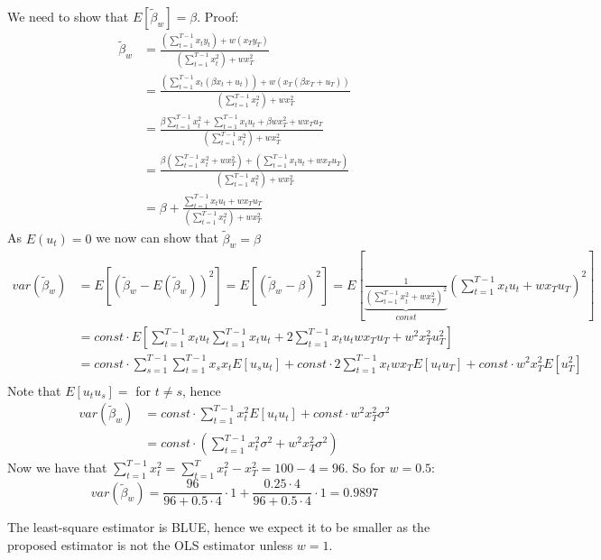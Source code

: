 \documentclass{article}
\begin{document}
\begin{Answer}
\Question
We need to show that $E[\tilde{\beta}_w] = \beta$. Proof:
\begin{align*}
\tilde{\beta}_w &= \frac{(\sum_{t=1}^{T-1}x_ty_t) + w (x_T y_T)}{(\sum_{t=1}^{T-1}x_t^2)+w x_T^2}\\
&= \frac{(\sum_{t=1}^{T-1}x_t(\beta x_t + u_t)) + w (x_T (\beta x_T + u_T))}{(\sum_{t=1}^{T-1}x_t^2)+w x_T^2}\\
&= \frac{\beta\sum_{t=1}^{T-1}x_t^2 + \sum_{t=1}^{T-1} x_t u_t + \beta w x_T^2 + w x_T u_T}{(\sum_{t=1}^{T-1}x_t^2)+w x_T^2}\\
&= \frac{\beta(\sum_{t=1}^{T-1}x_t^2 + w x_T^2) + (\sum_{t=1}^{T-1} x_t u_t  + w x_T u_T)}{(\sum_{t=1}^{T-1}x_t^2)+w x_T^2}\\
&= \beta + \frac{\sum_{t=1}^{T-1} x_t u_t  + w x_T u_T}{(\sum_{t=1}^{T-1}x_t^2)+w x_T^2}
\end{align*}
As $E(u_t)=0$ we now can show that
$\tilde{\beta}_w = \beta$
\Question
\begin{align*}
var(\tilde{\beta}_w) &= E[(\tilde{\beta}_w-E(\tilde{\beta}_w))^2] = E[(\tilde{\beta}_w-\beta)^2] = E\left[\underbrace{\frac{1}{(\sum_{t=1}^{T-1}x_t^2+w x_T^2)^2}}_{const}\left(\sum_{t=1}^{T-1} x_t u_t  + w x_T u_T\right)^2\right]\\
&= const \cdot E\left[\sum_{t=1}^{T-1}x_t u_t \sum_{t=1}^{T-1}x_t u_t + 2\sum_{t=1}^{T-1}x_t u_t wx_Tu_T + w^2x_T^2u_T^2\right]\\
&= const \cdot \sum_{s=1}^{T-1}\sum_{t=1}^{T-1}x_s x_t E[u_s u_t] + const\cdot 2 \sum_{t=1}^{T-1}x_t w x_T E[u_t u_T] + const\cdot w^2 x_T^2 E[u_T^2]\\
\end{align*}
Note that $E[u_tu_s]=$ for $t\neq s$, hence
\begin{align*}
var(\tilde{\beta}_w) &= const \cdot \sum_{t=1}^{T-1} x_t^2 E[u_t u_t] + const\cdot w^2 x_T^2 \sigma^2\\
&= const \cdot \left( \sum_{t=1}^{T-1} x_t^2 \sigma^2 + w^2 x_T^2 \sigma^2\right)
\end{align*}
Now we have that $\sum_{t=1}^{T-1}x_t^2=\sum_{t=1}^T x_t^2 - x_T^2 = 100-4 = 96$. So for $w=0.5$:
$$var(\tilde{\beta}_w) = \frac{96}{96+0.5\cdot 4}\cdot 1 + \frac{0.25\cdot 4}{96+0.5\cdot 4}\cdot 1 = 0.9897$$

\Question
The least-square estimator is BLUE, hence we expect it to be smaller as the proposed estimator is not the OLS estimator unless $w=1$.
\end{Answer}
\newpage
	
\end{document}
